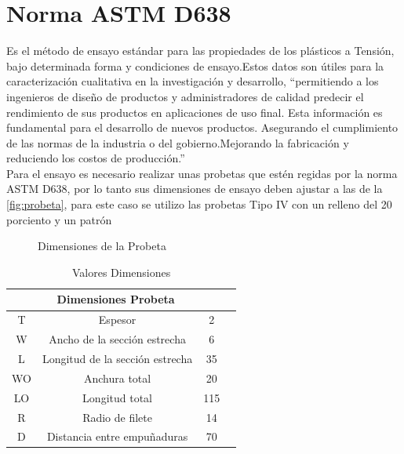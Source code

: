 \section{Norma ASTM D638}\label{norma}

Es el método de ensayo estándar para las propiedades de los plásticos a Tensión, bajo determinada forma y condiciones de ensayo.Estos datos son útiles para la caracterización cualitativa en la investigación y desarrollo,  “permitiendo a los ingenieros de diseño de productos y administradores de calidad predecir el rendimiento de sus productos en aplicaciones de uso final. Esta información es fundamental para el desarrollo de nuevos productos. Asegurando el cumplimiento de las normas de la industria o del gobierno.Mejorando la fabricación y reduciendo los costos de producción.'' \citep{rojas} \\

Para el ensayo es necesario realizar unas probetas que estén regidas por la norma \acrshort{ASTM} D638, por lo tanto sus dimensiones de ensayo deben ajustar a las de la \autoref{fig:probeta}, para este caso se utilizo las probetas Tipo IV con un relleno del 20 porciento y un patrón  

\begin{figure}[H]
    \centering
    \caption{Dimensiones de la Probeta \citep{laureto}}
    \label{fig:probeta}
\end{figure}

\begin{table}[H]
\begin{center}
\begin{tabular}{c c c c}
\multicolumn{3}{c}{\textbf{Dimensiones Probeta}} \\
\toprule[0.6mm]
T & Espesor & 2  \\ 
W& Ancho de la sección estrecha &6 \\ 
L & Longitud  de la sección estrecha&35 \\ 
WO & Anchura total&20 \\ 
LO & Longitud total &115 \\ 
R & Radio de filete &14  \\
D & Distancia entre empuñaduras &70  \\
\bottomrule[0.6mm]
\end{tabular}
\caption{Valores Dimensiones \citep{laureto}}
\label{tabla:Medidas Probeta}
\end{center}
\end{table}


